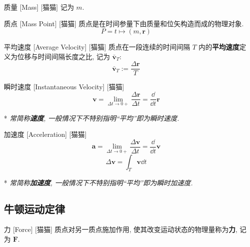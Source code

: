 \documentclass[UTF8]{ctexart}
\begin{document}
        \begin{dfn}
            []
            {质量}
            [Mass]
            [猫猫]
            记为 \(m\). 
        \end{dfn}
        
        \begin{dfn}
            []
            {质点}
            [Mass Point]
            [猫猫]
            质点是在时间参量下由质量和位矢构造而成的物理对象. 
            \[P=t\mapsto(m,\bm{r})\]
        \end{dfn}
        
        \begin{dfn}
            []
            {平均速度}
            [Average Velocity]
            [猫猫]
            质点在一段连续的时间间隔 \(T\) 内的\textbf{平均速度}定义为位移与时间间隔长度之比, 记为 \(\bar{\bm{v}}_T\): 
            \[\bar{\bm{v}}_T:=\frac{\Delta\bm{r}}{T}\]
        \end{dfn}
        
        \begin{dfn}
            []
            {瞬时速度}
            [Instantaneous Velocity]
            [猫猫]
            \[\bm{v}=\lim_{\Delta t\to 0+}\frac{\Delta\bm{r}}{\Delta t}=\frac{\dd}{\dd t}\bm{r}\]

            * \textit{常简称\textbf{速度}, 一般情况下不特别指明``平均''即为瞬时速度. }
        \end{dfn}
        
        \begin{dfn}
            {加速度}
            [Acceleration]
            [猫猫]
            \[\bm{a}=\lim_{\Delta t\to 0+}\frac{\Delta\bm{v}}{\Delta t}=\frac{\dd}{\dd t}\bm{v}\]
            \[\Delta\bm{v}=\int_T \bm{v}\dd t\]

            * \textit{常简称\textbf{加速度}, 一般情况下不特别指明``平均''即为瞬时加速度. }
        \end{dfn}

    \subsection{牛顿运动定律}
        
        \begin{dfn}
            []
            {力}
            [Force]
            [猫猫]
            质点对另一质点施加作用, 使其改变运动状态的物理量称为\textbf{力}, 记为 \(\bm{F}\). 
        \end{dfn}
        
\end{document}
